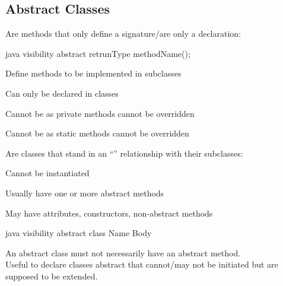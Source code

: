 \subsection{Abstract Classes}
\begin{defnbox}\nospacing
  \begin{defn}
    Are methods that only define a signature/are only a declaration:
    \begin{mintlinebox}{java}
      visibility abstract retrunType methodName();
    \end{mintlinebox}
    \begin{itemizenosep}
        \item Define methods to be implemented in subclasses
        \item Can only be declared in  classes
        \item Cannot be  as private methods cannot be overridden
        \item Cannot be  as static methods cannot be overridden
    \end{itemizenosep}
  \end{defn}
\end{defnbox}
\begin{defnbox}\nospacing
  \begin{defn}
    Are classes that stand in an ``'' relationship with their subclasses:
    \begin{figure}[H]	
      \centering
        \resizebox{0.35\linewidth}{!}{\tikzset{font=\Huge}}
    \end{figure}
    \begin{itemizenosep}
      \item Cannot be instantiated
      \item Usually have one or more abstract methods
      \item May have attributes, constructors, non-abstract methods 
    \end{itemizenosep}
    \begin{mintlinebox}{java}
      visibility abstract class Name{ Body }
    \end{mintlinebox}
  \end{defn}
\end{defnbox}
\begin{notebox}[Note]\nospacing
  An abstract class must not necessarily have an abstract method.\\
  Useful to declare classes abstract that cannot/may not be initiated but are
  supposed to be extended.
\end{notebox}
